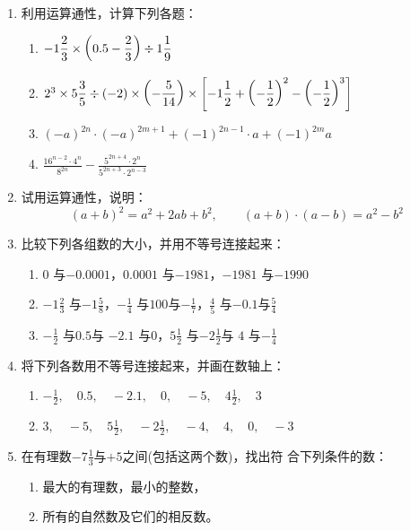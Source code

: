 \begin{enumerate}
    \item 利用运算通性，计算下列各题：
\begin{enumerate}
    \item $-1\dfrac{2}{3}\times \left(0.5-\dfrac{2}{3}\right)\div 1\dfrac{1}{9}$
    \item $2^3\times 5\dfrac{3}{5}\div (-2)\times\left(-\dfrac{5}{14}\right)\times \left[-1\dfrac{1}{2}+\left(-\dfrac{1}{2}\right)^2-\left(-\dfrac{1}{2}\right)^3\right]$
    \item $(-a)^{2n}\cdot (-a)^{2m+1}+(-1)^{2n-1}\cdot a+(-1)^{2m}a$
    \item $\frac{16^{n-2}\cdot 4^n}{8^{2n}}-\frac{5^{2n+4}\cdot 2^n}{5^{2n+3}\cdot 2^{n-3}}$
\end{enumerate}

\item 试用运算通性，说明：
\[(a+b)^2=a^2+2ab+b^2,\qquad (a+b)\cdot (a-b)=a^2-b^2 \]
\item 比较下列各组数的大小，并用不等号连接起来：
\begin{enumerate}
    \item $0$ 与$-0.0001$，\quad $0.0001$ 与$-1981$，\quad $-1981$ 与$-1990$ 
    \item $-1\frac{2}{3}$ 与$-1\frac{5}{8}$，\quad $-\frac{1}{4}$ 与$100$与$-\frac{1}{7}$，\quad $\frac{4}{5}$ 与$-0.1$与$\frac{5}{4}$
    \item  $-\frac{1}{2}$ 与$0.5$与 $-2.1$ 与$0$，\quad $5\frac{1}{2}$ 与$-2\frac{1}{2}$与 $4$ 与$-\frac{1}{4}$ 
\end{enumerate}

\item 将下列各数用不等号连接起来，并画在数轴上：
\begin{enumerate}
    \item $-\frac{1}{2},\quad  0.5 ,\quad -2.1  ,\quad 0  ,\quad -5  ,\quad  4\frac{1}{2} ,\quad 3  $
    \item $3,\quad  -5 ,\quad 5\frac{1}{2}  ,\quad  -2\frac{1}{2} ,\quad  -4 ,\quad  4 ,\quad  0 ,\quad  -3 $
\end{enumerate}

\item  在有理数$-7\frac{1}{3}$与$+5$之间(包括这两个数)，找出符
合下列条件的数：
\begin{enumerate}
    \item 最大的有理数，最小的整数，
    \item 所有的自然数及它们的相反数。
\end{enumerate}


\end{enumerate}
